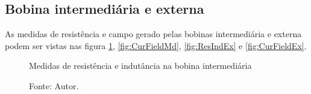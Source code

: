\subsection{Bobina intermediária e externa}

As medidas de resistência e campo gerado pelas bobinas intermediária e externa podem ser vistas nas figura \ref{fig:ResIndMd}, \ref{fig:CurFieldMd}, \ref{fig:ResIndEx} e \ref{fig:CurFieldEx}.

\begin{figure}[H]
    \centering
     \caption{Medidas de resistência e indutância na bobina intermediária}
     \caption*{Fonte: Autor.}\label{fig:ResIndMd}
\end{figure}

